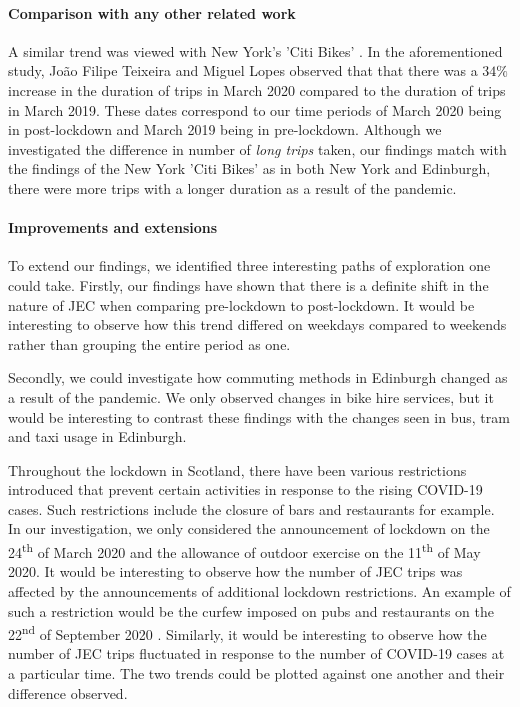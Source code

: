 \documentclass[11pt,a4paper]{article}
\begin{document}
\paragraph{Comparison with any other related work} A similar trend was viewed with New York's 'Citi Bikes' \cite{citiBike}. In the aforementioned study, João Filipe Teixeira and Miguel Lopes observed that that there was a $34\%$ increase in the duration of trips in March 2020 compared to the duration of trips in March 2019. These dates correspond to our time periods of March 2020 being in post-lockdown and March 2019 being in pre-lockdown. Although we investigated the difference in number of \emph{long trips} taken, our findings match with the findings of the New York 'Citi Bikes' as in both New York and Edinburgh, there were more trips with a longer duration as a result of the pandemic.

\paragraph{Improvements and extensions} To extend our findings, we identified three interesting paths of exploration one could take. Firstly, our findings have shown that there is a definite shift in the nature of JEC when comparing pre-lockdown to post-lockdown. It would be interesting to observe how this trend differed on weekdays compared to weekends rather than grouping the entire period as one.\par Secondly, we could investigate how commuting methods in Edinburgh changed as a result of the pandemic. We only observed changes in bike hire services, but it would be interesting to contrast these findings with the changes seen in bus, tram and taxi usage in Edinburgh. \par Throughout the lockdown in Scotland, there have been various restrictions introduced that prevent certain activities in response to the rising COVID-19 cases. Such restrictions include the closure of bars and restaurants for example. In our investigation, we only considered the announcement of lockdown on the 24\textsuperscript{th} of March 2020 and the allowance of outdoor exercise on the 11\textsuperscript{th} of May 2020. It would be interesting to observe how the number of JEC trips was affected by the announcements of additional lockdown restrictions. An example of such a restriction would be the curfew imposed on pubs and restaurants on the 22\textsuperscript{nd} of September 2020 \cite{timeline}. Similarly, it would be interesting to observe how the number of JEC trips fluctuated in response to the number of COVID-19 cases at a particular time. The two trends could be plotted against one another and their difference observed. 



\end{document}

